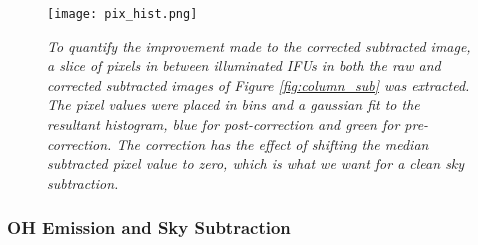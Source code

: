 \documentclass{literature}
\begin{document}
\begin{figure}[!htp]
\centering
\texttt{[image: pix\_hist.png]}
\caption{\footnotesize{\emph{To quantify the improvement made to the corrected subtracted image, a slice of pixels in between illuminated IFUs in both the raw and corrected subtracted images of Figure \ref{fig:column_sub} was extracted. The pixel values were placed in bins and a gaussian fit to the resultant histogram, blue for post-correction and green for pre-correction. The correction has the effect of shifting the median subtracted pixel value to zero, which is what we want for a clean sky subtraction. }}}
\label{fig:pix_hist}
\end{figure}





\subsubsection{OH Emission and Sky Subtraction}\label{subsubsec:Oh_lines}
\end{document}
